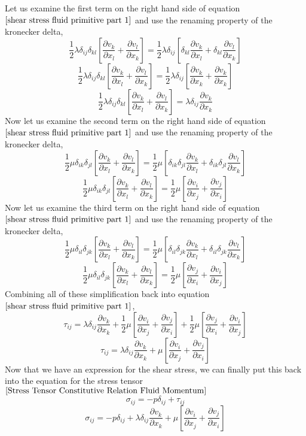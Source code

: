 Let us examine the first term on the right hand side of equation $\ref{shear stress fluid primitive part 1}$ and use the renaming property of the kronecker delta,
$$\frac{1}{2}\lambda \delta_{ij}\delta_{kl}\left[\frac{\partial v_{k}}{\partial x_{l}} + \frac{\partial v_{l}}{\partial x_{k}}\right] = \frac{1}{2}\lambda \delta_{ij}\left[\delta_{kl}\frac{\partial v_{k}}{\partial x_{l}} + \delta_{kl}\frac{\partial v_{l}}{\partial x_{k}}\right]$$
$$\frac{1}{2}\lambda \delta_{ij}\delta_{kl}\left[\frac{\partial v_{k}}{\partial x_{l}} + \frac{\partial v_{l}}{\partial x_{k}}\right] = \frac{1}{2}\lambda \delta_{ij}\left[\frac{\partial v_{k}}{\partial x_{k}} + \frac{\partial v_{k}}{\partial x_{k}}\right]$$
$$\frac{1}{2}\lambda \delta_{ij}\delta_{kl}\left[\frac{\partial v_{k}}{\partial x_{l}} + \frac{\partial v_{l}}{\partial x_{k}}\right] = \lambda \delta_{ij}\frac{\partial v_{k}}{\partial x_{k}}$$
Now let us examine the second term on the right hand side of equation $\ref{shear stress fluid primitive part 1}$ and use the renaming property of the kronecker delta,
$$\frac{1}{2}\mu\delta_{ik}\delta_{jl}\left[\frac{\partial v_{k}}{\partial x_{l}} + \frac{\partial v_{l}}{\partial x_{k}}\right] = \frac{1}{2}\mu\left[\delta_{ik}\delta_{jl}\frac{\partial v_{k}}{\partial x_{l}} + \delta_{ik}\delta_{jl}\frac{\partial v_{l}}{\partial x_{k}}\right]$$
$$\frac{1}{2}\mu\delta_{ik}\delta_{jl}\left[\frac{\partial v_{k}}{\partial x_{l}} + \frac{\partial v_{l}}{\partial x_{k}}\right] = \frac{1}{2}\mu\left[\frac{\partial v_{i}}{\partial x_{j}} + \frac{\partial v_{j}}{\partial x_{i}}\right]$$
Now let us examine the third term on the right hand side of equation $\ref{shear stress fluid primitive part 1}$ and use the renaming property of the kronecker delta,
$$\frac{1}{2}\mu\delta_{il}\delta_{jk}\left[\frac{\partial v_{k}}{\partial x_{l}} + \frac{\partial v_{l}}{\partial x_{k}}\right] = \frac{1}{2}\mu\left[\delta_{il}\delta_{jk}\frac{\partial v_{k}}{\partial x_{l}} + \delta_{il}\delta_{jk}\frac{\partial v_{l}}{\partial x_{k}}\right]$$
$$\frac{1}{2}\mu\delta_{il}\delta_{jk}\left[\frac{\partial v_{k}}{\partial x_{l}} + \frac{\partial v_{l}}{\partial x_{k}}\right] = \frac{1}{2}\mu\left[\frac{\partial v_{j}}{\partial x_{i}} + \frac{\partial v_{i}}{\partial x_{j}}\right]$$
Combining all of these simplification back into equation $\ref{shear stress fluid primitive part 1}$,
$$\tau_{ij} = \lambda \delta_{ij}\frac{\partial v_{k}}{\partial x_{k}} + \frac{1}{2}\mu\left[\frac{\partial v_{i}}{\partial x_{j}} + \frac{\partial v_{j}}{\partial x_{i}}\right] + \frac{1}{2}\mu\left[\frac{\partial v_{j}}{\partial x_{i}} + \frac{\partial v_{i}}{\partial x_{j}}\right]$$
$$\tau_{ij} = \lambda \delta_{ij}\frac{\partial v_{k}}{\partial x_{k}} + \mu\left[\frac{\partial v_{i}}{\partial x_{j}} + \frac{\partial v_{j}}{\partial x_{i}}\right]$$
Now that we have an expression for the shear stress, we can finally put this back into the equation for the stress tensor $\ref{Stress Tensor Constitutive Relation Fluid Momentum}$
$$\sigma_{ij} = -p\delta_{ij} + \tau_{ij}$$
$$\sigma_{ij} = -p\delta_{ij} + \lambda \delta_{ij}\frac{\partial v_{k}}{\partial x_{k}} + \mu\left[\frac{\partial v_{i}}{\partial x_{j}} + \frac{\partial v_{j}}{\partial x_{i}}\right]$$

